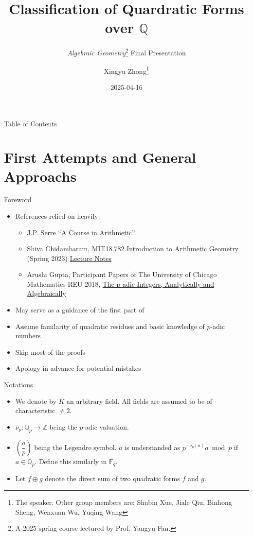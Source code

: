\documentclass[fontset=fandol,envcountsect]{ctexbeamer}
\title{Classification of Quardratic Forms over \(\mathbb Q\)}
\subtitle{\textit{Algebraic Geometry}\thanks{A 2025 spring course lectured by Prof. Yangyu Fan.}
Final Presentation}
\author{Xingyu
Zhong\thanks{The speaker. Other group members are: Shubin Xue, Jiale Qiu, Binhong Sheng, Wenxuan Wu, Yuqing Wang}}
\institute[BIT]{Beijing Institute of Technology}
\date{2025-04-16}
\def\transtoc{目录}
\def\transtoc{Table of Contents}
\theoremstyle{theorem}
\theoremstyle{example}
\theoremstyle{remark}
\theoremstyle{theorem}
\theoremstyle{example}
\theoremstyle{remark}
\let\textbf\alert
\begin{document}
\frame{\titlepage}

\begin{frame}{\transtoc}
  \tableofcontents
\end{frame}

\section{First Attempts and General
Approachs}\label{first-attempts-and-general-approachs}

\begin{frame}{Foreword}
\label{foreword}
\newcommand{\T}{\mathrm{T}}
\newcommand{\Image}{\operatorname{Im}}
\newcommand{\rk}{\operatorname{rk}}
\newcommand{\sgn}{\operatorname{sgn}}
\newcommand{\rad}{\operatorname{rad}}

\begin{itemize}
\item
  References relied on heavily:

  \begin{itemize}
  \item
    J.P. Serre ``A Course in Arithmetic'' \autocite{serre_course_1973}
  \item
    Shiva Chidambaram, MIT18.782 Introduction to Arithmetic Geometry
    (Spring 2023)
    \href{https://math.mit.edu/classes/18.782/2023sp/LectureNotes9.pdf}{Lecture
    Notes}
  \item
    Arushi Gupta, Participant Papers of The University of Chicago
    Mathematics REU 2018,
    \href{https://math.uchicago.edu/~may/REU2018/REUPapers/Gupta.pdf}{The
    p-adic Integers, Analytically and Algebraically}
  \end{itemize}
\item
  May serve as a guidance of the first part of
  \autocite{serre_course_1973}
\item
  Assume familarity of quadratic residues and basic knowledge of
  \(p\)-adic numbers
\item
  Skip most of the proofs
\item
  Apology in advance for potential mistakes
\end{itemize}
\end{frame}

\begin{frame}{Notations}
\label{notations}
\begin{itemize}
\item
  We denote by \(K\) an arbitrary field. \textbf{All fields are assumed
  to be of characteristic \(\neq 2\)}.
\item
  \(\nu_p : \mathbb Q_p \to \mathbb Z\) being the \(p\)-adic valuation.
\item
  \(\left(\dfrac a p \right)\) being the Legendre symbol. \(a\) is
  understanded as \(p^{-\nu_p(a)} a \bmod p\) if \(a \in \mathbb Q_p\).
  Define this similarly in \(\mathbb F_q\).
\item
  Let \(f \oplus g\) denote the direct sum of two quadratic forms \(f\)
  and \(g\).
\end{itemize}
\end{frame}
\end{document}
